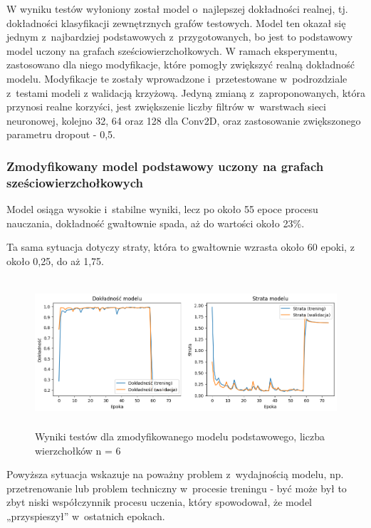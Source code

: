 W wyniku testów wyłoniony został model o~najlepszej dokładności realnej, tj.
dokładności klasyfikacji zewnętrznych grafów testowych.
Model ten okazał się jednym z~najbardziej podstawowych z~przygotowanych,
bo jest to podstawowy model uczony na grafach sześciowierzchołkowych.
W ramach eksperymentu, zastosowano dla niego modyfikacje,
które pomogły zwiększyć realną dokładność modelu.
Modyfikacje te zostały wprowadzone i~przetestowane w~podrozdziale z~testami modeli
z walidacją krzyżową.
Jedyną zmianą z~zaproponowanych, która przynosi realne korzyści,
jest zwiększenie liczby filtrów w~warstwach sieci neuronowej, kolejno 32, 64 oraz 128 dla Conv2D,
oraz zastosowanie zwiększonego parametru dropout - 0,5.

\subsubsection{Zmodyfikowany model podstawowy uczony na grafach sześciowierzchołkowych}

Model osiąga wysokie i~stabilne wyniki, lecz po około 55 epoce procesu nauczania,
dokładność gwałtownie spada, aż do wartości około 23\%.

Ta sama sytuacja dotyczy straty, która to gwałtownie wzrasta około 60 epoki,
z około 0,25, do aż 1,75.

\begin{figure}[ht]
	\centering
	\includegraphics[height=5.5cm]{resources/tests/images/v4/base6_1_img.png}
	\caption{Wyniki testów dla zmodyfikowanego modelu podstawowego, liczba wierzchołków n = 6}
	\label{Fig:tests-best-0a}
\end{figure}
\FloatBarrier

Powyższa sytuacja wskazuje na poważny problem z~wydajnością modelu,
np. przetrenowanie lub problem techniczny w~procesie treningu
- być może był to zbyt niski współczynnik procesu uczenia,
który spowodował, że model „przyspieszył” w~ostatnich epokach.


